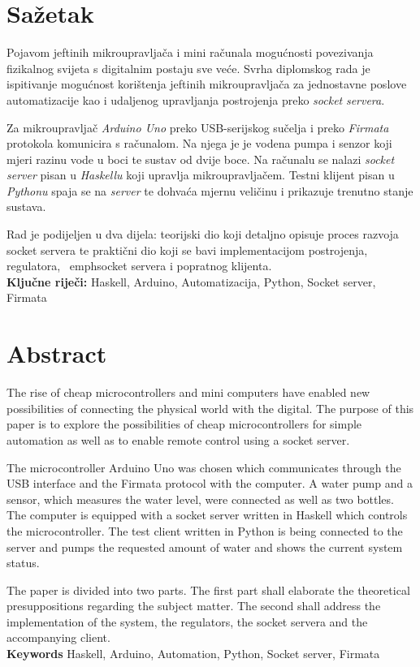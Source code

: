 \newpage

\chapter*{Sažetak}
Pojavom jeftinih mikroupravljača i mini računala mogućnosti povezivanja
fizikalnog svijeta s digitalnim postaju sve veće.
Svrha diplomskog rada je ispitivanje mogućnost korištenja jeftinih mikroupravljača
za jednostavne poslove automatizacije kao i udaljenog upravljanja postrojenja 
preko \emph{socket} \emph{servera}.

Za mikroupravljač \emph{Arduino Uno} preko USB-serijskog sučelja i preko \emph{Firmata} 
protokola komunicira s računalom. Na njega je je vodena pumpa i senzor koji mjeri 
razinu vode u boci te sustav od dvije boce. Na računalu se nalazi \emph{socket} \emph{server} 
pisan u \emph{Haskellu} koji upravlja mikroupravljačem. Testni klijent pisan u 
\emph{Pythonu} spaja se na \emph{server} te dohvaća mjernu veličinu 
i prikazuje trenutno stanje sustava.

Rad je podijeljen u dva dijela: teorijski dio koji detaljno opisuje proces razvoja socket 
servera te praktični dio koji se bavi implementacijom postrojenja, regulatora, \
emph{socket servera} i popratnog klijenta.
\\

\noindent\textbf{Ključne riječi:} Haskell, Arduino, Automatizacija,
Python, Socket server, Firmata
\chapter*{Abstract}
The rise of cheap microcontrollers and mini computers have enabled new possibilities
of connecting the physical world with the digital.
The purpose of this paper is to explore the possibilities of cheap microcontrollers 
for simple automation as well as to enable remote control using a socket server.

The microcontroller Arduino Uno was chosen which communicates through the USB 
interface and the  Firmata protocol with the computer. A water pump and a sensor, 
which measures the water level, were connected as well as two bottles. 
The computer is equipped with a socket server written in Haskell 
which controls the microcontroller. The test client written in Python is being 
connected to the server and pumps the requested amount of water and shows the 
current system status.

The paper is divided into two parts. The first part shall elaborate the theoretical presuppositions 
regarding the subject matter. The second shall address the implementation of the system, 
the regulators, the socket servera and the accompanying client.
\\

\noindent\textbf{Keywords} Haskell, Arduino, Automation,
Python, Socket server, Firmata
